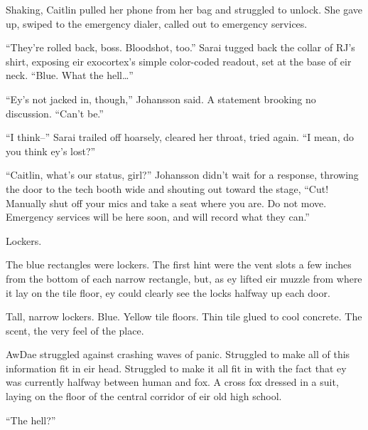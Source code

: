 Shaking, Caitlin pulled her phone from her bag and struggled to unlock. She gave up, swiped to the emergency dialer, called out to emergency services.

``They're rolled back, boss. Bloodshot, too.'' Sarai tugged back the collar of RJ's shirt, exposing eir exocortex's simple color-coded readout, set at the base of eir neck. ``Blue. What the hell\ldots{}''

``Ey's not jacked in, though,'' Johansson said. A statement brooking no discussion. ``Can't be.''

``I think--'' Sarai trailed off hoarsely, cleared her throat, tried again. ``I mean, do you think ey's lost?''

``Caitlin, what's our status, girl?'' Johansson didn't wait for a response, throwing the door to the tech booth wide and shouting out toward the stage, ``Cut! Manually shut off your mics and take a seat where you are. Do not move. Emergency services will be here soon, and will record what they can.''

Lockers.

The blue rectangles were lockers. The first hint were the vent slots a few inches from the bottom of each narrow rectangle, but, as ey lifted eir muzzle from where it lay on the tile floor, ey could clearly see the locks halfway up each door.

Tall, narrow lockers. Blue. Yellow tile floors. Thin tile glued to cool concrete. The scent, the very feel of the place.

AwDae struggled against crashing waves of panic. Struggled to make all of this information fit in eir head. Struggled to make it all fit in with the fact that ey was currently halfway between human and fox. A cross fox dressed in a suit, laying on the floor of the central corridor of eir old high school.

``The hell?''
